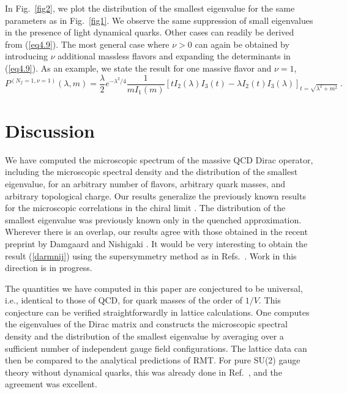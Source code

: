 In Fig.~\ref{fig2}, we plot the distribution of the smallest
eigenvalue for the same parameters as in Fig.~\ref{fig1}. We observe
the same suppression of small eigenvalues in the presence of light
dynamical quarks.
Other cases can readily be derived from (\ref{eq4.9}).  The most
general case where $\nu>0$ can again be obtained by introducing $\nu$
additional massless flavors and expanding the determinants in
(\ref{eq4.9}).  As an example, we state the result for one massive
flavor and $\nu=1$,
\begin{equation}
  P^{(N_f=1,\nu=1)}(\lambda,m)=\frac{\lambda}{2}
  e^{-\lambda^2/4}\frac{1}{mI_1(m)}
  \left[tI_2(\lambda)I_3(t)-\lambda I_2(t)I_3(\lambda)
  \right]_{t=\sqrt{\lambda^2+m^2}}\:.
\end{equation}


\section{Discussion}
\label{sec4}

We have computed the microscopic spectrum of the massive QCD Dirac
operator, including the microscopic spectral density and the
distribution of the smallest eigenvalue, for an arbitrary number of
flavors, arbitrary quark masses, and arbitrary topological charge.
Our results generalize the previously known results for the
microscopic correlations in the chiral limit \cite{Verb93}.  The
distribution of the smallest eigenvalue was previously known only in
the quenched approximation.  Wherever there is an overlap, our results
agree with those obtained in the recent preprint by Damgaard and
Nishigaki \cite{Damg97}.  It would be very interesting to obtain the
result (\ref{darmnij}) using the supersymmetry method as in
Refs.~\cite{Guhr97a,Jack97a}.  Work in this direction is in progress.

The quantities we have computed in this paper are conjectured to be
universal, i.e., identical to those of QCD, for quark masses of the
order of $1/V$.  This conjecture can be verified straightforwardly in
lattice calculations.  One computes the eigenvalues of the Dirac
matrix and constructs the microscopic spectral density and the
distribution of the smallest eigenvalue by averaging over a sufficient
number of independent gauge field configurations.  The lattice data
can then be compared to the analytical predictions of RMT.  For pure
SU(2) gauge theory without dynamical quarks, this was already done in
Ref.~\cite{Berb97a}, and the agreement was excellent.

